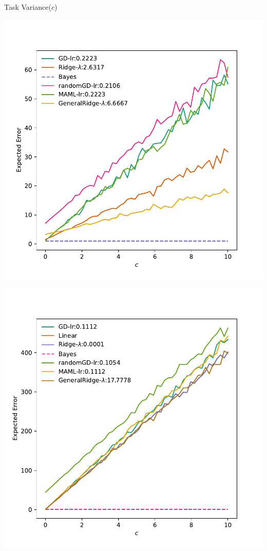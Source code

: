 \documentclass[aspectratio=169]{beamer}
\begin{document}
\begin{frame}{Task Variance($c$)}
{\begin{minipage}{0.33\textwidth}
  \end{minipage}%
  \begin{minipage}{0.33\textwidth}
    \includegraphics[width=\textwidth]{Figures/c-10-10-x-1.pdf}
  \end{minipage}%
  \begin{minipage}{0.33\textwidth}
    \includegraphics[width=\textwidth]{Figures/c-50-10-x-0.pdf}
  \end{minipage}
}
\end{frame}
\end{document}
